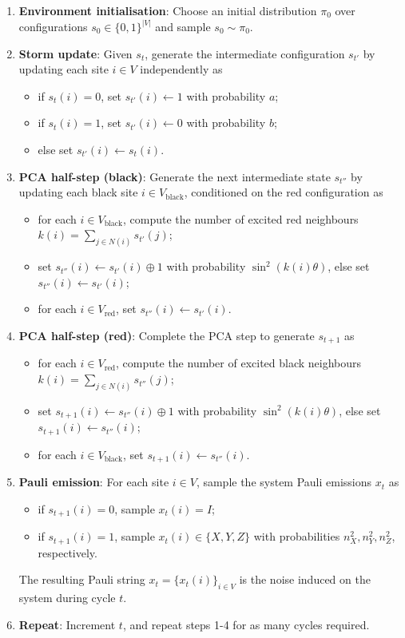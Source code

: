 \begin{enumerate}
    \item[0.] \textbf{Environment initialisation}: Choose an initial distribution $\pi_0$ over configurations $s_0\in\{0,1\}^{|V|}$ and sample $s_{0}\sim\pi_0$.

    \item \textbf{Storm update}: Given \(s_{t}\), generate the intermediate configuration \(s_{t'}\) by updating each site \(i\in V\) independently as
    \begin{itemize}
        \item if \(s_{t}(i) = 0\), set \(s_{t'}(i) \gets 1\) with probability \(a\);
        \item if \(s_{t}(i) = 1\), set \(s_{t'}(i) \gets 0\) with probability \(b\);
        \item else set \(s_{t'}(i) \gets s_{t}(i)\).
    \end{itemize}
    \item \textbf{PCA half-step (black)}: Generate the next intermediate state \(s_{t''}\) by updating each black site \(i\in V_\mathrm{black}\), conditioned on the red configuration as
    \begin{itemize}
        \item for each \(i \in V_\mathrm{black}\), compute the number of excited red neighbours \(k(i) = \sum_{j \in N(i)} s_{t'}(j)\);
        \item set \(s_{t''}(i) \gets s_{t'}(i) \oplus 1\) with probability \(\sin^2(k(i)\theta)\), else set \(s_{t''}(i) \gets s_{t'}(i)\);
        \item for each \(i \in V_\mathrm{red}\), set \(s_{t''}(i) \gets s_{t'}(i)\).
    \end{itemize}
    \item \textbf{PCA half-step (red)}: Complete the PCA step to generate \(s_{t+1}\) as
    \begin{itemize}
        \item for each \(i \in V_\mathrm{red}\), compute the number of excited black neighbours \(k(i) = \sum_{j \in N(i)} s_{t''}(j)\);
        \item set \(s_{t+1}(i) \gets s_{t''}(i) \oplus 1\) with probability \(\sin^2(k(i)\theta)\), else set \(s_{t+1}(i) \gets s_{t''}(i)\);
        \item for each \(i \in V_\mathrm{black}\), set \(s_{t+1}(i) \gets s_{t''}(i)\).
    \end{itemize}
    \item \textbf{Pauli emission}: For each site \(i\in V\), sample the system Pauli emissions \(x_t\) as
    \begin{itemize}
        \item if \(s_{t+1}(i) = 0\), sample \(x_t(i)=I\);
        \item if \(s_{t+1}(i) = 1\), sample \(x_t(i) \in \{X, Y, Z\}\) with probabilities \(n_X^2, n_Y^2, n_Z^2\), respectively.
    \end{itemize}
    The resulting Pauli string \(x_t = \{x_t(i)\}_{i\in V}\) is the noise induced on the system during cycle \(t\).
    \item \textbf{Repeat}: Increment \(t\), and repeat steps 1-4 for as many cycles required.
\end{enumerate}
